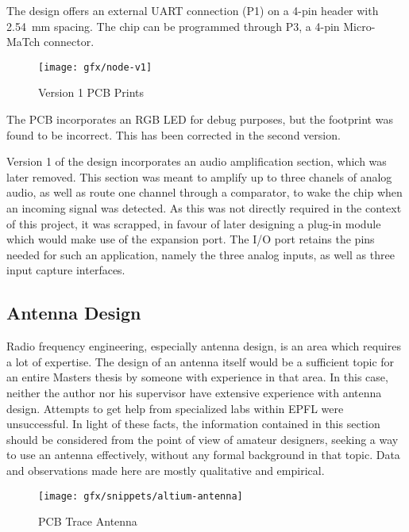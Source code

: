 The design offers an external UART connection (P1) on a 4-pin header with
\SI{2.54}{mm} spacing. The chip can be programmed through P3, a 4-pin
Micro-MaTch\textsuperscript{\texttrademark} connector.

\begin{figure}[htb]
  \begin{center}
    \texttt{[image: gfx/node-v1]}
  \end{center}
  \caption{Version 1 PCB Prints}
  \label{fig:v1-prints}
\end{figure}

The PCB incorporates an RGB LED for debug purposes, but the footprint was found
to be incorrect. This has been corrected in the second version.

Version 1 of the design incorporates an audio amplification section, which was
later removed. This section was meant to amplify up to three chanels of analog
audio, as well as route one channel through a comparator, to wake the chip when
an incoming signal was detected. As this was not directly required in the
context of this project, it was scrapped, in favour of later designing a plug-in
module which would make use of the expansion port. The I/O port retains the pins
needed for such an application, namely the three analog inputs, as well as three
input capture interfaces.


\subsection{Antenna Design}

Radio frequency engineering, especially antenna design, is an area which
requires a lot of expertise. The design of an antenna itself would be
a sufficient topic for an entire Masters thesis by someone with experience in
that area. In this case, neither the author nor his supervisor have extensive
experience with antenna design. Attempts to get help from specialized labs
within EPFL were unsuccessful. In light of these facts, the information
contained in this section should be considered from the point of view of amateur
designers, seeking a way to use an antenna effectively, without any formal
background in that topic. Data and observations made here are mostly qualitative
and empirical.

\begin{figure}[htb]
  \begin{center}
    \texttt{[image: gfx/snippets/altium-antenna]}
  \end{center}
  \caption{PCB Trace Antenna}
  \label{fig:trace-antenna}
\end{figure}

